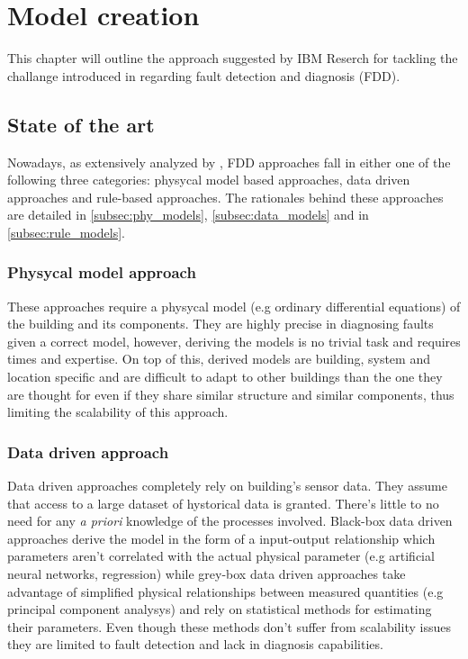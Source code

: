 \chapter{Model creation} \label{ch:model}
This chapter will outline the approach suggested by IBM Reserch for tackling the challange introduced in \textbf{} regarding fault detection and diagnosis (FDD). %

\section{State of the art}
Nowadays, as extensively analyzed by \textcite{methods_for_diagnostic}, FDD approaches fall in either one of the following three categories: physycal model based approaches, data driven approaches and rule-based approaches. The rationales behind these approaches are detailed in \autoref{subsec:phy_models}, \autoref{subsec:data_models} and in \autoref{subsec:rule_models}.

\subsection{Physycal model approach} \label{subsec:phy_models}
These approaches require a physycal model (e.g ordinary differential equations) of the building and its components. They are highly precise in diagnosing faults given a correct model, however, deriving the models is no trivial task and requires times and expertise. On top of this, derived models are building, system and location specific and are difficult to adapt to other buildings than the one they are thought for even if they share similar structure and similar components, thus limiting the scalability of this approach.

\subsection{Data driven approach} \label{subsec:data_models}
Data driven approaches completely rely on building's sensor data. They assume that access to a large dataset of hystorical data is granted. There's little to no need for any \textit{a priori} knowledge of the processes involved. Black-box data driven approaches derive the model in the form of a input-output relationship which parameters aren't correlated with the actual physical parameter (e.g artificial neural networks, regression) while grey-box data driven approaches take advantage of simplified physical relationships between measured quantities (e.g principal component analysys) and rely on statistical methods for estimating their parameters. Even though these methods don't suffer from scalability issues they are limited to fault detection and lack in diagnosis capabilities.

